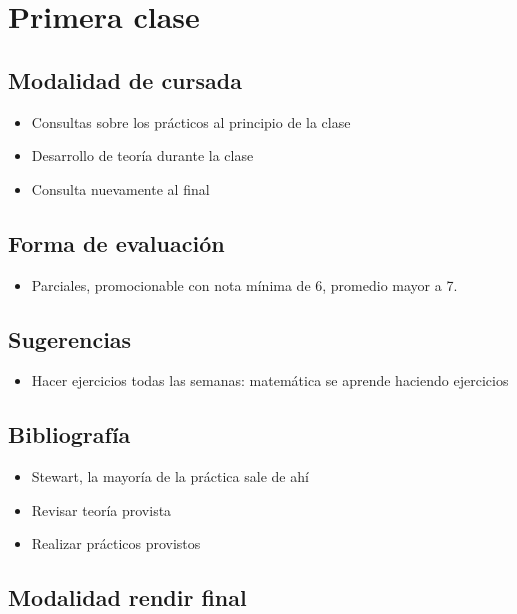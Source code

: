 \section{Primera clase}

\subsection{Modalidad de cursada}

\begin{itemize}
    \item Consultas sobre los prácticos al principio de la clase 
    \item Desarrollo de teoría durante la clase 
    \item Consulta nuevamente al final 
\end{itemize}

\subsection{Forma de evaluación}

\begin{itemize}
    \item Parciales, promocionable con nota mínima de 6, promedio mayor a 7.
\end{itemize}

\subsection{Sugerencias}

\begin{itemize}
    \item Hacer ejercicios todas las semanas: matemática se aprende haciendo 
    ejercicios 
\end{itemize}

\subsection{Bibliografía}

\begin{itemize}
    \item Stewart, la mayoría de la práctica sale de ahí 
    \item Revisar teoría provista 
    \item Realizar prácticos provistos 
\end{itemize}

\subsection{Modalidad rendir final}

